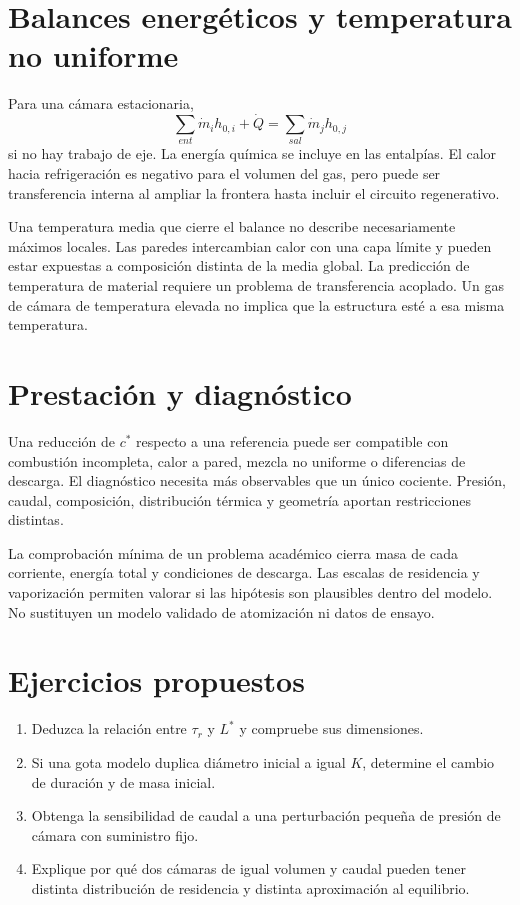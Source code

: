 \section{Balances energéticos y temperatura no uniforme}
Para una cámara estacionaria,
\[
 \sum_{ent}\dot m_i h_{0,i}+\dot Q
 =\sum_{sal}\dot m_j h_{0,j}
\]
si no hay trabajo de eje. La energía química se incluye en las entalpías. El calor hacia refrigeración es negativo para el volumen del gas, pero puede ser transferencia interna al ampliar la frontera hasta incluir el circuito regenerativo.

Una temperatura media que cierre el balance no describe necesariamente máximos locales. Las paredes intercambian calor con una capa límite y pueden estar expuestas a composición distinta de la media global. La predicción de temperatura de material requiere un problema de transferencia acoplado. Un gas de cámara de temperatura elevada no implica que la estructura esté a esa misma temperatura.
\section{Prestación y diagnóstico}
Una reducción de $c^*$ respecto a una referencia puede ser compatible con combustión incompleta, calor a pared, mezcla no uniforme o diferencias de descarga. El diagnóstico necesita más observables que un único cociente. Presión, caudal, composición, distribución térmica y geometría aportan restricciones distintas.

La comprobación mínima de un problema académico cierra masa de cada corriente, energía total y condiciones de descarga. Las escalas de residencia y vaporización permiten valorar si las hipótesis son plausibles dentro del modelo. No sustituyen un modelo validado de atomización ni datos de ensayo.
\section{Ejercicios propuestos}
\begin{enumerate}
\item Deduzca la relación entre $\tau_r$ y $L^*$ y compruebe sus dimensiones.
\item Si una gota modelo duplica diámetro inicial a igual $K$, determine el cambio de duración y de masa inicial.
\item Obtenga la sensibilidad de caudal a una perturbación pequeña de presión de cámara con suministro fijo.
\item Explique por qué dos cámaras de igual volumen y caudal pueden tener distinta distribución de residencia y distinta aproximación al equilibrio.
\end{enumerate}
